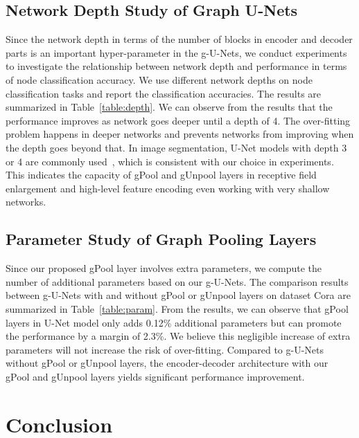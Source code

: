 \documentclass{article}
\begin{document}
\subsection{Network Depth Study of Graph U-Nets}\label{sec:exp_depth}

Since the network depth in terms of the number of blocks in encoder
and decoder parts is an important hyper-parameter in the g-U-Nets,
we conduct experiments to investigate the relationship between
network depth and performance in terms of node classification
accuracy. We use different network depths on node classification
tasks and report the classification accuracies. The results are
summarized in Table~\ref{table:depth}. We can observe from the
results that the performance improves as network goes deeper until a
depth of 4. The over-fitting problem happens in deeper networks and
prevents networks from improving when the depth goes beyond that. In
image segmentation, U-Net models with depth 3 or 4 are commonly
used~\citep{badrinarayanan2017segnet,cciccek20163d}, which is
consistent with our choice in experiments. This indicates the
capacity of gPool and gUnpool layers in receptive field enlargement
and high-level feature encoding even working with very shallow
networks.






\subsection{Parameter Study of Graph Pooling Layers}\label{sec:exp_param}

Since our proposed gPool layer involves extra parameters, we compute
the number of additional parameters based on our g-U-Nets. The
comparison results between g-U-Nets with and without gPool or
gUnpool layers on dataset Cora are summarized in
Table~\ref{table:param}. From the results, we can observe that gPool
layers in U-Net model only adds 0.12\% additional parameters but can
promote the performance by a margin of 2.3\%. We believe this
negligible increase of extra parameters will not increase the risk
of over-fitting. Compared to g-U-Nets without gPool or gUnpool
layers, the encoder-decoder architecture with our gPool and gUnpool
layers yields significant performance improvement.



\section{Conclusion}
\end{document}
